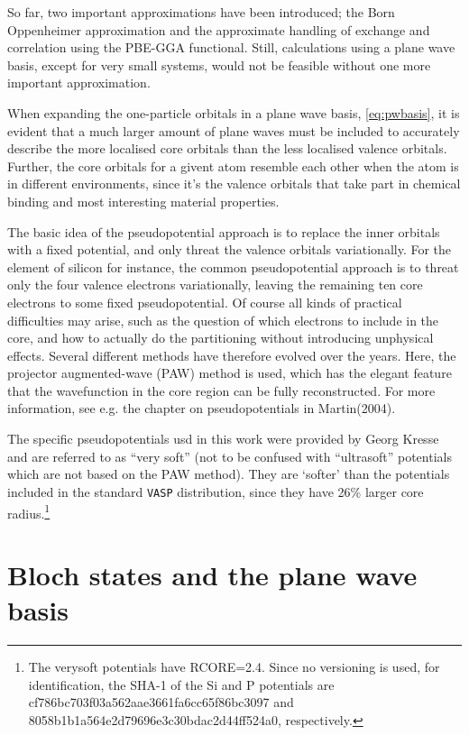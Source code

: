 \documentclass[11pt,bibliography=totoc,index=totoc]{scrbook}   %
\newcommand{\vasp}{{\texttt{VASP}}} %
\begin{document}
So far, two important approximations have been introduced; the Born Oppenheimer approximation 
and the approximate handling of exchange and correlation using the PBE-GGA functional. 
Still, calculations using a plane wave basis, except for very small systems, would not be feasible without one more important approximation.

When expanding the one-particle orbitals in a plane wave basis, \eqref{eq:pwbasis}, 
it is evident that a much larger amount of plane waves must be included to accurately describe the more localised core orbitals than the less localised valence orbitals. 
Further, the core orbitals for a givent atom resemble each other when the atom is in different environments, since it's the valence orbitals that take part in chemical binding and most interesting material properties.

The basic idea of the pseudopotential approach is to replace the inner orbitals with a fixed potential, and only threat the valence orbitals variationally.
For the element of silicon for instance, the common pseudopotential approach is to threat only the four valence electrons variationally,
leaving the remaining ten core electrons to some fixed pseudopotential.
Of course all kinds of practical difficulties may arise, such as the question of which electrons to include in the core, and how to actually do the partitioning without introducing unphysical effects.
Several different methods have therefore evolved over the years.
Here, the projector augmented-wave (PAW) method\cite{Blochl:1994} is used, which has the elegant feature that the wavefunction in the core region can be fully reconstructed.
For more information, see e.g. the chapter on pseudopotentials in Martin(2004)\cite[204-299]{Martin:2004}.

The specific pseudopotentials usd in this work were provided by Georg Kresse and are referred to as ``very soft''\cite{verysoftpot} (not to be confused with ``ultrasoft'' potentials which are not based on the PAW method).
They are `softer' than the potentials included in the standard {\vasp} distribution,\cite{Kresse:1999}
since they have 26\% larger core radius.\footnote{The verysoft potentials have RCORE=2.4. Since no versioning is used, for identification, the SHA-1 of the Si and P potentials are cf786bc703f03a562aae3661fa6cc65f86bc3097 and 8058b1b1a564e2d79696e3c30bdac2d44ff524a0, respectively.}

%
\section{Bloch states and the plane wave basis}\label{sec:planewavebasis}
%
\end{document}
